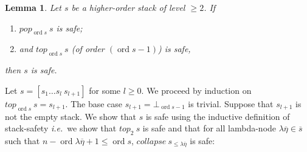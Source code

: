\documentclass{article}
\newcommand{\ord}{\mathop{\mathrm{ord}}}
\newcommand{\prefixof}{\leqslant}
\newtheorem{lemma}{Lemma}[section]
\theoremstyle{remark}
\theoremstyle{definition}
\newcommand\orddec\overline
\def\ie{{\it i.e.}\ }
\begin{document}
\begin{lemma}
\label{lem:cons_qsafety} Let $s$ be a higher-order stack of level $\geq 2$. If
\begin{enumerate}[1.]
\item $pop_{\ord{s}}~s$ is safe;
\item and $top_{\ord{s}}~s$ (of order $(\ord{s}-1)$) is safe,
\end{enumerate}
then $s$ is safe.
\end{lemma}
\proof
Let $s = [s_1 \ldots s_l~s_{l+1}]$ for some $l\geq0$.
We proceed by induction on  $top_{\ord{s}}~s=s_{l+1}$.
The base case $s_{l+1} = \bot_{\ord{s}-1}$ is trivial.
Suppose that $s_{l+1}$ is not the empty stack. We show that $s$ is safe using the inductive definition of stack-safety \ie we show that $top_2~s$ is safe and that for all lambda-node $\lambda \overline{\eta} \in \orddec{s}$ such that $n-\ord{\lambda \overline{\eta}}+1 \leq \ord{s}$, $collapse~s_{\prefixof \lambda \overline{\eta}}$ is safe:
\end{document}
